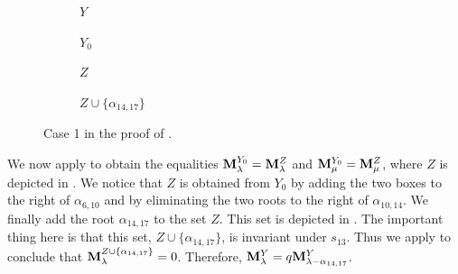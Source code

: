 \begin{example}
\begin{figure}[H]
     \centering
     \begin{subfigure}[b]{0.22\textwidth}
         \centering
        {}
    \caption{ $Y$  }
    \label{fig: ExaLemma3.10A}
     \end{subfigure}
     \hfill
     \begin{subfigure}[b]{0.22\textwidth}
         \centering
        {}
    \caption{ $Y_{0}$  }
    \label{fig: ExaLemma3.10B}
     \end{subfigure}
     \hfill
     \begin{subfigure}[b]{0.22\textwidth}
         \centering
        {}
    \caption{$Z$}
    \label{fig: ExaLemma3.10C}
     \end{subfigure}
     \hfill
     \begin{subfigure}[b]{0.22\textwidth}
         \centering
        {}
    \caption{$Z\cup\{\alpha_{14,17}\}$}
    \label{fig: ExaLemma3.10D}
     \end{subfigure}
        \caption{Case 1 in the proof of .}
        \label{fig: EJEMPLO Lemma 3.10}
\end{figure}

We now apply  to obtain the equalities  $\mathbf{M}_\lambda^{Y_0}=\mathbf{M}_\lambda^Z$ and $\mathbf{M}_\mu^{Y_0}=\mathbf{M}_\mu^Z$, where $Z$ is depicted in . We notice that $Z$ is obtained from $Y_0$ by adding the two boxes to the right of $\alpha_{6,10}$ and by eliminating the two roots to the right of $\alpha_{10,14}$. We finally add the root $\alpha_{14,17}$ to the set $Z$. This set is depicted in . The important thing here is that this set, $Z\cup \{\alpha_{14,17}\}$, is invariant under $s_{13}$. Thus we apply  to conclude that $\mathbf{M}_{\lambda}^{Z\cup \{\alpha_{14,17}\}}=0$. Therefore, $\mathbf{M}_\lambda^Y = q\mathbf{M}^Y_{\lambda-\alpha_{14,17}}$. 


\end{example}
